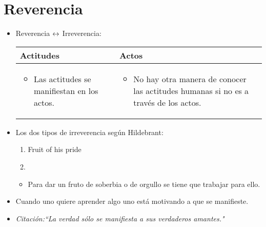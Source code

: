 \section{Reverencia}
\begin{itemize}
    \item Reverencia $\leftrightarrow$ Irreverencia:
        \begin{center}
           \begin{tabular}{ | p{5cm} | p{5cm} | }
               \hline
                   Actitudes & Actos     \\
               \hline
                    \begin{itemize}
                        \item Las actitudes se manifiestan en los actos.
                    \end{itemize}
                    & 
                    \begin{itemize}
                        \item No hay otra manera de conocer las actitudes humanas si no es a través de los actos.
                    \end{itemize}
                    \\ 
               \hline
           \end{tabular}
        \end{center}
    
    \item Los dos tipos de irreverencia según Hildebrant:
        \begin{enumerate}
            \item Fruit of his pride 
            \item 
        \end{enumerate}

        \begin{itemize}
            \item Para dar un fruto de soberbia o de orgullo se tiene que trabajar para ello.
        \end{itemize}
    
    \item Cuando uno quiere aprender algo uno está motivando a que se manifieste.
    \item \emph{Citación:``La verdad sólo se manifiesta a sus verdaderos amantes."} 
\end{itemize}
